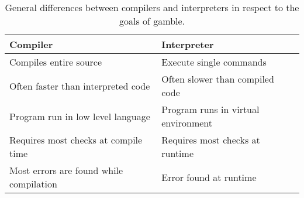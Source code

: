 \begin{table}[h]
    \centering
    \begin{tabular}{|l|l|}
    \hline
    \textbf{Compiler}                           & \textbf{Interpreter}           \\ \hline
    Compiles entire source                      & Execute single commands         \\ \hline 
    Often faster than interpreted code          & Often slower than compiled code \\ \hline
    Program run in low level language           & Program runs in virtual environment      \\ \hline
    Requires most checks at compile time        & Requires most checks at runtime      \\ \hline
    Most errors are found while compilation     & Error found at runtime \\ \hline 
    \end{tabular} 
    \caption{General differences between compilers and interpreters in respect to the goals of \gls{gamble}.}
    \label{tbl:compint}
\end{table}

